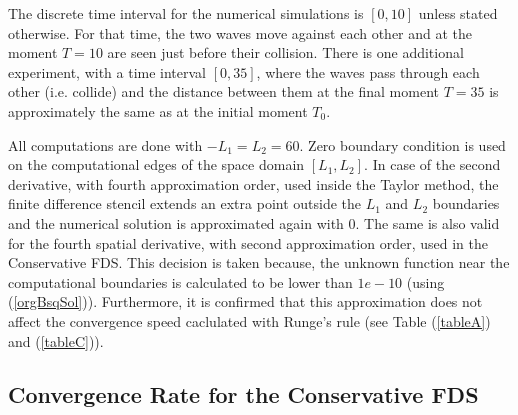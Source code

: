 \documentclass[%
 aip,
cp,  
 amsmath,amssymb,
 reprint,
]{iopconfser}
\newcommand{\rf}[1]{(\ref{#1})}
\begin{document}
The discrete time interval for the numerical simulations is $[0, 10]$ unless stated otherwise. For that time, the two waves move against each other and at the moment $T=10$ are seen just before their collision. There is one additional experiment, with a time interval $[0, 35]$, where the waves pass through each other (i.e. collide) and the distance between them at the final moment $T=35$ is approximately the same as at the initial moment $T_0$. 

All computations are done with $-L_1 = L_2 = 60$.
Zero boundary condition is used on the computational edges of the space domain $[L_1, L_2]$. In case of the second derivative, with fourth approximation order, used inside the Taylor method, the finite difference stencil extends an extra point outside the $L_1$ and $L_2$ boundaries and the numerical solution is approximated again with $0$. The same is also valid for the fourth spatial derivative, with second approximation order, used in the Conservative FDS. This decision is taken because, the unknown function near the computational boundaries is calculated to be lower than $1e-10$ (using \rf{orgBsqSol}). Furthermore, it is confirmed that
this approximation does not affect the convergence speed caclulated with Runge's rule (see Table \rf{tableA} and \rf{tableC}).

\subsection{Convergence Rate for the Conservative FDS}
\end{document}
